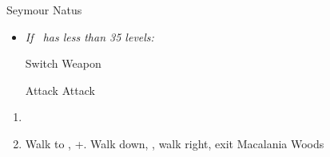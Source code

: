 \bothvfill
\begin{battle}[36000]{Seymour Natus}
	\begin{itemize}
		\item \textit{If \lulu\ has less than 35 levels:}
		      \begin{itemize}
			      \switch{\tidus}{\lulu}
			      \luluf Switch Weapon
			      \switch{\lulu}{\tidus}
		      \end{itemize}
		      \tidusf Attack
		      \summon{\bahamut}
		      \bahamutf Attack
	\end{itemize}
\end{battle}
\begin{enumerate}[resume]
	\item \sd
	\item Walk to \yuna, \cs+\skippablefmv[10:10]. Walk down, \cs[1:40], walk right, exit Macalania Woods
\end{enumerate}
\bothnpsingle
